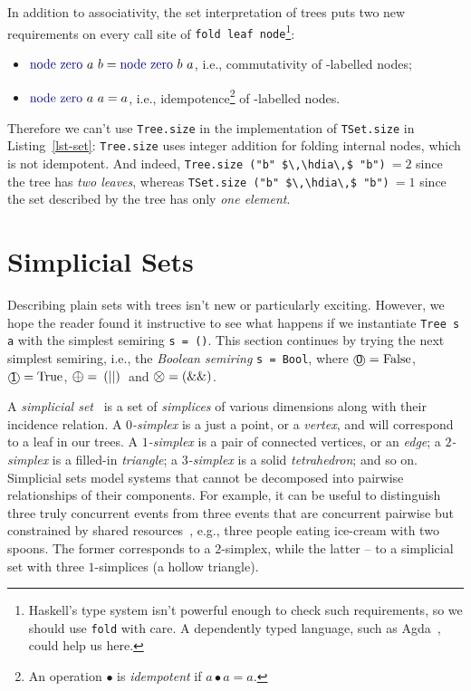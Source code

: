 \documentclass[crc,english]{programming}
\newcommand{\code}[1]{\lstinline[mathescape]|#1|}
\newcommand{\hcode}[1]{{\color{darkblue} \lstinline[keywordstyle={}]|#1|}} %
\newcommand{\hfcode}[1]{{\color{darkblue} \lstinline[keywordstyle={},basicstyle=\footnotesize\ttfamily]|#1|}} %
\newcommand{\hdia}{\,\text{\raisebox{-0.2mm}{\Large\color{darkblue} $\diamond$}}\,}
\newcommand{\add}{\text{\raisebox{-0.1mm}{\large $\oplus$}}}
\newcommand{\mul}{\text{\raisebox{-0.1mm}{\large $\otimes$}}}
\newcommand{\zero}{\raisebox{-0.2mm}{\textcircled{\textsf{0}}}\xspace}
\newcommand{\one}{\raisebox{-0.2mm}{\textcircled{\textsf{\hspace{-0.2mm}1}}}\xspace}
\begin{document}
In addition to associativity, the set interpretation of trees puts two new
requirements on every call site of \hcode{fold leaf node}\footnote{
    Haskell's type system isn't powerful enough to check such requirements, so
    we should use \hfcode{fold} with care. A dependently typed language, such as
    Agda~\cite{2007_norell_agda}, could help us here.
}:

\begin{itemize}
    \item $\text{\hcode{node zero}}~a~b = \text{\hcode{node zero}}~b~a$, i.e.,
          commutativity of \zero-labelled nodes;
    \item $\text{\hcode{node zero}}~a~a = a$, i.e.,
    idempotence\footnote{
         An operation $\bullet$ is \emph{idempotent} if $a \bullet a = a$.
    } of \zero-labelled nodes.
\end{itemize}

\noindent
Therefore we can't use \hcode{Tree.}\code{size} in the implementation of
\hcode{TSet.}\code{size} in Listing~\ref{lst-set}: \hcode{Tree.}\code{size} uses
integer addition for folding internal nodes, which is not idempotent. And
indeed, \hcode{Tree.}\code{size ("b" $\,\hdia\,$ "b")}$\ =2$ since the tree has
\emph{two leaves}, whereas \hcode{TSet.}\code{size ("b" $\,\hdia\,$ "b")}$\ = 1$
since the set described by the tree has only \emph{one element}.

\section{Simplicial Sets}\label{sec-simplicial-set}
\vspace{-1mm}

Describing plain sets with trees isn't new or particularly exciting. However, we
hope the reader found it instructive to see what happens if we instantiate
\hcode{Tree s a} with the simplest semiring \hcode{s = ()}. This section
continues by trying the next simplest semiring, i.e., the
\emph{Boolean semiring} \hcode{s = Bool}, where $\zero = \text{\code{False}}$,
$\one = \text{\code{True}}$, $\add = \text{\code{(\|\|)}}$ and
$\mul = \text{\code{(&&)}}$.

A \emph{simplicial set}~\cite{friedman_simplicial_sets} is a set of
\emph{simplices} of various dimensions along with their incidence relation.
A \emph{$0$-simplex} is a just a point, or a \emph{vertex}, and will correspond
to a leaf in our trees. A \emph{$1$-simplex} is a pair of connected vertices, or
an \emph{edge}; a \emph{$2$-simplex} is a filled-in \emph{triangle}; a
\emph{$3$-simplex} is a solid \emph{tetrahedron}; and so on. Simplicial sets
model systems that cannot be decomposed into pairwise relationships of their
components. For example, it can be useful to distinguish three truly
concurrent events from three events that are concurrent pairwise but constrained
by shared resources~\cite{rosenblum1989look}, e.g., three people eating
ice-cream with two spoons. The former corresponds to a $2$-simplex, while the
latter -- to a simplicial set with three $1$-simplices (a hollow triangle).
\end{document}
